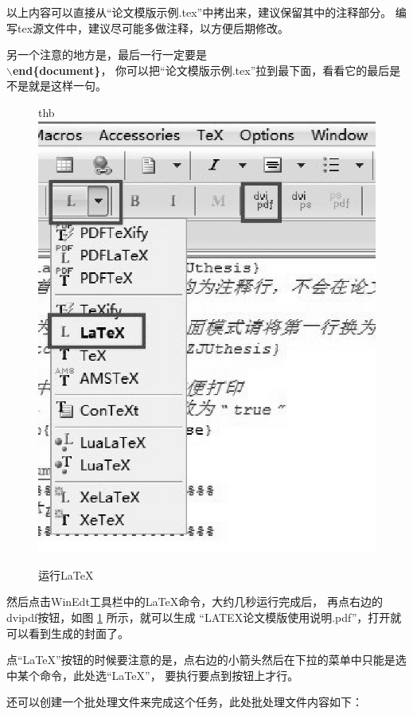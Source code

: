 以上内容可以直接从“论文模版示例.tex”中拷出来，建议保留其中的注释部分。
编写tex源文件中，建议尽可能多做注释，以方便后期修改。

另一个注意的地方是，最后一行一定要是\\
 {\bf$\backslash$end\{document\}}，
你可以把“论文模版示例.tex”拉到最下面，看看它的最后是不是就是这样一句。

\begin{figure}{thb}
\centering
\includegraphics[scale=0.8]{./Pictures/runLaTeX.eps}
\caption{运行LaTeX}
\label{runLaTeX}
\end{figure}

然后点击WinEdt工具栏中的LaTeX命令，大约几秒运行完成后，
再点右边的dvipdf按钮，如图 \ref{runLaTeX} 所示，就可以生成
“LATEX论文模版使用说明.pdf”，打开就可以看到生成的封面了。

点“LaTeX”按钮的时候要注意的是，点右边的小箭头然后在下拉的菜单中只能是选中某个命令，此处选“LaTeX”，
要执行要点到按钮上才行。

还可以创建一个批处理文件来完成这个任务，此处批处理文件内容如下：

